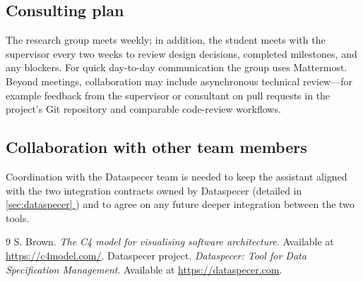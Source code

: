 \documentclass{article}
\newcommand*{\fullref}[1]{\hyperref[{#1}]{\ref*{#1} \nameref*{#1}}}
\begin{document}
\subsection{Consulting plan}

The research group meets weekly; in addition, the student meets with the supervisor every two weeks to review design decisions, completed milestones, and any blockers. For quick day-to-day communication the group uses Mattermost.
Beyond meetings, collaboration may include asynchronous technical review---for example feedback from the supervisor or consultant on pull requests in the project's Git repository and comparable code-review workflows.

\subsection{Collaboration with other team members}

Coordination with the Dataspecer team is needed to keep the assistant aligned with the two integration contracts owned by Dataspecer (detailed in \fullref{sec:dataspecer}) and to agree on any future deeper integration between the two tools.

\begin{thebibliography}{9}
S. Brown. \textit{The C4 model for visualising software architecture}. Available at \url{https://c4model.com/}.
Dataspecer project. \textit{Dataspecer: Tool for Data Specification Management}. Available at \url{https://dataspecer.com}.
\end{thebibliography}
\end{document}
